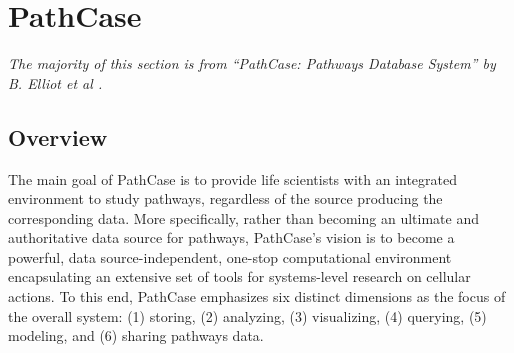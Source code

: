 \section{PathCase}
\label{sect:pathcase}

\emph{The majority of this section is from ``PathCase: Pathways Database System''
by B. Elliot et al \cite{pathcase-paper}.}

\subsection{Overview}
\label{sect:pathcase_overview}

The main goal of PathCase is to provide life scientists with an integrated
environment to study pathways, regardless of the source producing the
corresponding data. More specifically, rather than becoming an ultimate and
authoritative data source for pathways, PathCase’s vision is to become a
powerful, data source-independent, one-stop computational environment
encapsulating an extensive set of tools for systems-level research on cellular
actions. To this end, PathCase emphasizes six distinct dimensions as the focus
of the overall system: (1) storing, (2) analyzing, (3) visualizing, (4)
querying, (5) modeling, and (6) sharing pathways data.

